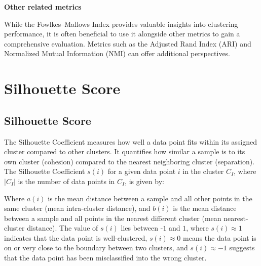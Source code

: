 \begin{center}
\clearpage

\thispagestyle{customstyle}

\textbf{Other related metrics}

While the Fowlkes–Mallows Index provides valuable insights into clustering performance, it is often beneficial to use it
alongside other metrics to gain a comprehensive evaluation. Metrics such as the Adjusted Rand Index (ARI) and Normalized Mutual
Information (NMI) can offer additional perspectives.


\clearpage
\thispagestyle{clusteringstyle}
\section{Silhouette Score}
\subsection{Silhouette Score}

The Silhouette Coefficient measures how well a data point fits within its assigned cluster compared to other clusters. 
It quantifies how similar a sample is to its own cluster (cohesion) compared to the nearest neighboring cluster (separation).
The Silhouette Coefficient $s(i)$ for a given data point $i$ in the cluster $C_I$, where $|C_I|$ is the number of data points in $C_I$, is given by:

\begin{center}
\end{center}

Where  $a(i)$ is the mean distance between a sample and all other points in the same cluster (mean intra-cluster distance), 
and  $b(i)$ is the mean distance between a sample and all points in the nearest different cluster (mean nearest-cluster distance). 
The value of  $s(i)$ lies between -$1$ and  $1$, where  $s(i) \approx 1$ indicates that the data point is well-clustered, 
 $s(i) \approx 0$ means the data point is on or very close to the boundary between two clusters, and  $s(i) \approx -1$ 
suggests that the data point has been misclassified into the wrong cluster.


\end{center}
